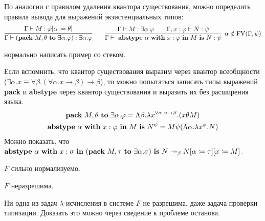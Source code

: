 По аналогии с правилом удаления квантора существования, можно определить правила вывода для выражений экзистенциальных типов:
\begin{gather*}
    \infer{\Gamma\vdash (\pack{M, \theta}{\exists \alpha . \varphi}) : \exists \alpha.\varphi}
        {\Gamma \vdash M : \varphi[\alpha := \theta]} \qquad
    \infer[\alpha \notin \FV(\Gamma, \psi)]
        {\Gamma \vdash~\abstype{\alpha}{x:\varphi}{M}{N:\psi}}
        {\Gamma \vdash M : \exists \alpha . \varphi && \Gamma, x : \varphi \vdash N : \psi}
\end{gather*}
\begin{example} \todo нормально написать пример со стеком.
\end{example}
Если вспомнить, что квантор существования выразим через квантор всеобщности
($\exists \alpha . x \equiv \forall \beta . (\forall \alpha . x \rightarrow \beta) \rightarrow \beta$),
то можно попытаться записать типы выражений \textbf{pack} и \textbf{abstype} через квантор существования и выразить их без расширения языка.
\begin{gather*}
    \text{\textbf{pack}}~M, \theta~\text{\textbf{to}}~\exists \alpha . \varphi = 
        \Lambda \beta . \lambda x^{\forall \alpha . \varphi \rightarrow \beta} . (x \theta M) \\
    \text{\textbf{abstype}}~\alpha~\text{\textbf{with}}~x : \varphi~\text{\textbf{in}}~M~\text{\textbf{is}}~N^\psi =
        M \psi (\Lambda \alpha . \lambda x ^ \varphi . N)
\end{gather*}
Можно показать, что $\text{\textbf{abstype}}~\alpha~\text{\textbf{with}}~x:\sigma~\text{\textbf{in}}~(\text{\textbf{pack}}~M,\tau~\text{\textbf{to}}~\exists\alpha .\sigma)~\text{\textbf{is}}~N\twoheadrightarrow_\beta N[\alpha\coloneqq\tau][x\coloneqq M]$.
\todo
\begin{example} \todo
\end{example}

\begin{statement}
    $F$ сильно нормализуемо.
\end{statement}

\begin{statement}
    $F$ неразрешима.
\end{statement}
Ни одна из задач $\lambda$-исчисления в системе $F$ не разрешима, даже задача проверки типизации.
Доказать это можно через сведение к проблеме останова.

